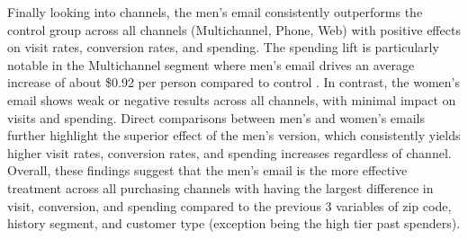 \documentclass[10pt]{article}
\begin{document}
Finally looking into channels, the men’s email consistently outperforms the control group across all channels (Multichannel, Phone, Web) with positive effects on visit rates, conversion rates, and spending. The spending lift is particularly notable in the Multichannel segment where men’s email drives an average increase of about \$0.92 per person compared to control . In contrast, the women’s email shows weak or negative results across all channels, with minimal impact on visits and spending. Direct comparisons between men’s and women’s emails further highlight the superior effect of the men’s version, which consistently yields higher visit rates, conversion rates, and spending increases regardless of channel. Overall, these findings suggest that the men’s email is the more effective treatment across all purchasing channels with having the largest difference in visit, conversion, and spending compared to the previous 3 variables of zip code, history segment, and customer type (exception being the high tier past spenders).



\end{document}
